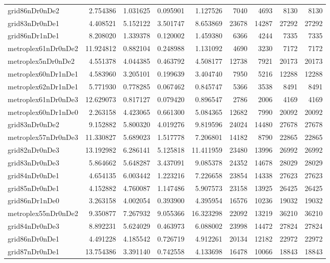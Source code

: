 \begin{longtable}{|l|r|r|r|r|r|r|r|r|}
grid86nDr0nDe2 & 2.754386 & 1.031625 & 0.095901 & 1.127526 & 7040 & 4693 & 8130 & 8130 \\
grid83nDr0nDe1 & 4.408521 & 5.152122 & 3.501747 & 8.653869 & 23678 & 14287 & 27292 & 27292 \\
grid86nDr1nDe1 & 8.208020 & 1.339378 & 0.120002 & 1.459380 & 6366 & 4244 & 7335 & 7335 \\
metroplex61nDr0nDe2 & 11.924812 & 0.882104 & 0.248988 & 1.131092 & 4690 & 3230 & 7172 & 7172 \\
metroplex5nDr0nDe2 & 4.551378 & 4.044385 & 0.463792 & 4.508177 & 12738 & 7921 & 20173 & 20173 \\
metroplex60nDr1nDe1 & 4.583960 & 3.205101 & 0.199639 & 3.404740 & 7950 & 5216 & 12288 & 12288 \\
metroplex62nDr1nDe1 & 5.771930 & 0.778285 & 0.067462 & 0.845747 & 5366 & 3538 & 8491 & 8491 \\
metroplex61nDr0nDe3 & 12.629073 & 0.817127 & 0.079420 & 0.896547 & 2786 & 2006 & 4169 & 4169 \\
metroplex60nDr1nDe0 & 2.263158 & 4.423065 & 0.661300 & 5.084365 & 12682 & 7990 & 20092 & 20092 \\
grid83nDr0nDe2 & 9.152882 & 5.800320 & 4.019276 & 9.819596 & 24024 & 14480 & 27678 & 27678 \\
metroplex57nDr0nDe3 & 11.330827 & 5.689023 & 1.517778 & 7.206801 & 14182 & 8790 & 22865 & 22865 \\
grid82nDr0nDe3 & 13.192982 & 6.286141 & 5.125818 & 11.411959 & 23480 & 13996 & 26992 & 26992 \\
grid83nDr0nDe3 & 5.864662 & 5.648287 & 3.437091 & 9.085378 & 24352 & 14678 & 28029 & 28029 \\
grid84nDr0nDe1 & 4.654135 & 6.003442 & 1.223216 & 7.226658 & 23854 & 14338 & 27623 & 27623 \\
grid85nDr0nDe1 & 4.152882 & 4.760087 & 1.147486 & 5.907573 & 23158 & 13925 & 26425 & 26425 \\
grid86nDr1nDe0 & 3.263158 & 4.002054 & 0.393900 & 4.395954 & 16576 & 10236 & 19032 & 19032 \\
metroplex55nDr0nDe2 & 9.350877 & 7.267932 & 9.055366 & 16.323298 & 22092 & 13219 & 36210 & 36210 \\
grid84nDr0nDe3 & 8.892231 & 5.624029 & 0.463973 & 6.088002 & 23998 & 14472 & 27824 & 27824 \\
grid86nDr0nDe1 & 4.491228 & 4.185542 & 0.726719 & 4.912261 & 20134 & 12182 & 22972 & 22972 \\
grid87nDr0nDe1 & 13.754386 & 3.391140 & 0.742558 & 4.133698 & 16478 & 10066 & 18843 & 18843 \\

\end{longtable}
